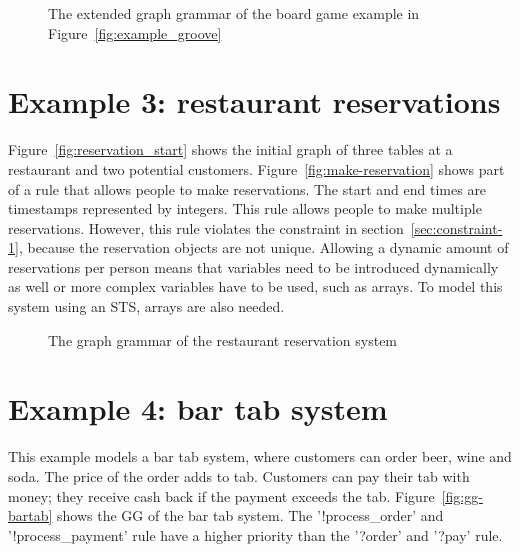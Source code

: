 \begin{figure}[ht]
  \begin{center}
    \hspace{20px}
  \end{center}
  \caption{The extended graph grammar of the board game example in Figure~\ref{fig:example_groove}}
  \label{fig:gg-fwgc-extended}
\end{figure}

\section{Example 3: restaurant reservations}
Figure~\ref{fig:reservation_start} shows the initial graph of three tables at a restaurant and two potential customers. Figure~\ref{fig:make-reservation} shows part of a rule that allows people to make reservations. The start and end times are timestamps represented by integers. This rule allows people to make multiple reservations. However, this rule violates the constraint in section~\ref{sec:constraint-1}, because the reservation objects are not unique. Allowing a dynamic amount of reservations per person means that variables need to be introduced dynamically as well or more complex variables have to be used, such as arrays. To model this system using an STS, arrays are also needed.

\begin{figure}[ht]
  \begin{center}
    \hspace{20px}
  \end{center}
  \caption{The graph grammar of the restaurant reservation system}
  \label{fig:gg-reservation}
\end{figure} 


\section{Example 4: bar tab system}
This example models a bar tab system, where customers can order beer, wine and soda. The price of the order adds to tab. Customers can pay their tab with money; they receive cash back if the payment exceeds the tab. Figure~\ref{fig:gg-bartab} shows the GG of the bar tab system. The '!process\_order' and '!process\_payment' rule have a higher priority than the '?order' and '?pay' rule. 

